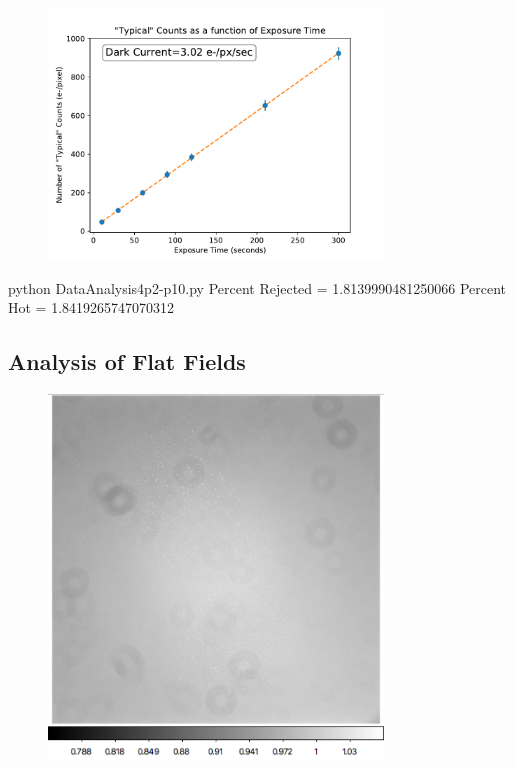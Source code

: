 \documentclass[preprint]{aastex62}
\begin{document}
    
        \begin{figure}
          \centering
            \includegraphics[width=3.5in]{../images/pos10DARK_typical-exposure.pdf}
            \caption{}
          \label{fig:pos10DARK_typical-exposure}
        \end{figure} 
    
    python DataAnalysis4p2-p10.py 
    Percent Rejected = 1.8139990481250066
    Percent Hot = 1.8419265747070312
    
  \subsection{Analysis of Flat Fields}
    
        \begin{figure}
          \centering
            \includegraphics[width=3.5in]{../images/flat_master.png}
            \caption{}
          \label{fig:flat_master}
        \end{figure}
    
\end{document}
